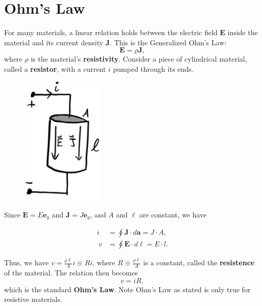 \documentclass[
  letterpaper,
  DIV=11,
  numbers=noendperiod]{scrreprt}
\begin{document}
\hypertarget{ohms-law}{%
\section{Ohm's Law}\label{ohms-law}}

For many materials, a linear relation holds between the electric field
\(\mathbf{E}\) inside the material and its current density
\(\mathbf{J}\). This is the Generalized Ohm's Law:
\[\mathbf{E} = \rho \mathbf{J},\] where \(\rho\) is the material's
\textbf{resistivity}. Consider a piece of cylindrical material, called a
\textbf{resistor}, with a current \(i\) pumped through its ends.

\begin{figure}

{\centering \includegraphics[width=1.5625in,height=\textheight]{circuits/./resources/image-20230212052106358.png}

}

\end{figure}

Since \(\mathbf{E} = E \mathbf{e}_y\) and
\(\mathbf{J} = J \mathbf{e}_y\), and \(A\) and \(\ell\) are constant, we
have

\begin{align*}

i &= \oint \mathbf{J} \cdot d\mathbf{a} = J \cdot A, \\\

v &= \oint \mathbf{E} \cdot d\mathbf{\ell} = E \cdot l.

\end{align*}

Thus, we have \(v = \frac{\rho \ell}{A}i \equiv Ri\), where
\(R \equiv \frac{\rho \ell}{A}\) is a constant, called the
\textbf{resistence} of the material. The relation then becomes
\[v = iR,\] which is the standard \textbf{Ohm's Law}. Note Ohm's Law as
stated is only true for resistive materials.
\end{document}
